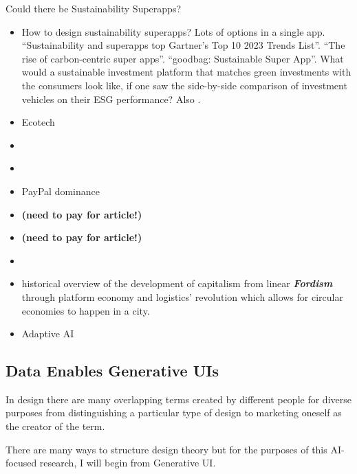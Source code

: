 \documentclass[
  letterpaper,
  DIV=11,
  numbers=noendperiod]{scrartcl}
\begin{document}
Could there be Sustainability Superapps?

\begin{itemize}
\item
  How to design sustainability superapps? Lots of options in a single
  app. \citep{fleetmanagementweeklySustainableSuperappShows2022}
  ``Sustainability and superapps top Gartner's Top 10 2023 Trends
  List''. \citep{davewallaceRiseCarboncentricSuper2021} ``The rise of
  carbon-centric super apps''.
  \citep{goodbagGoodbagSustainableSuper2023} ``goodbag: Sustainable
  Super App''. What would a sustainable investment platform that matches
  green investments with the consumers look like, if one saw the
  side-by-side comparison of investment vehicles on their ESG
  performance? Also \citep{bernardSustainabilitySuperappsTop2022}.
\item
  \citet{undheimEcoTechInvesting2024} Ecotech
\item
  \citet{loriperriWhatSuperapp2022}
\item
  \citet{PartnershipBringsSustainability2022}
\item
  \citet{CompanyNowDominating2021} PayPal dominance
\item
  \citet{zengThreeParadoxesBuilding2015} \textbf{(need to pay for
  article!)}
\item
  \citet{huangRedomesticatingSocialMedia2021} \textbf{(need to pay for
  article!)}
\item
  \citet{WillEuropeGet2022}
\item
  \citep{cuppiniWhenCitiesMeet2022} historical overview of the
  development of capitalism from linear \textbf{\emph{Fordism}} through
  platform economy and logistics' revolution which allows for circular
  economies to happen in a city.
\item
  Adaptive AI
\end{itemize}

\subsection{Data Enables Generative
UIs}\label{data-enables-generative-uis}

In design there are many overlapping terms created by different people
for diverse purposes from distinguishing a particular type of design to
marketing oneself as the creator of the term.

There are many ways to structure design theory but for the purposes of
this AI-focused research, I will begin from Generative UI.
\end{document}
